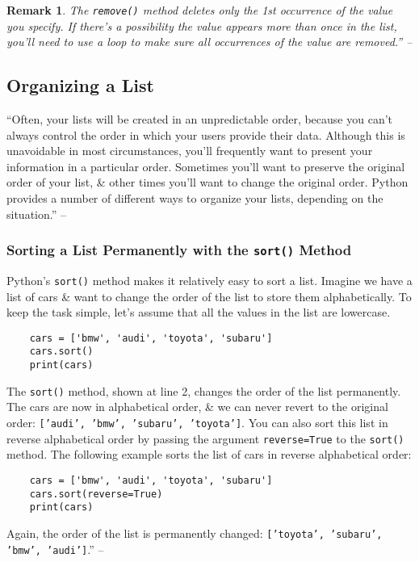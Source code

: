 \documentclass[oneside]{book}
\numberwithin{equation}{section}
\newtheorem{remark}{Remark}[chapter]
\begin{document}
\begin{remark}
	The \texttt{remove()} method deletes only the 1st occurrence of the value you specify. If there's a possibility the value appears more than once in the list, you'll need to use a loop to make sure all occurrences of the value are removed.'' -- \cite[pp. 41--42]{Matthes2019}
\end{remark}

\subsection{Organizing a List}
``Often, your lists will be created in an unpredictable order, because you can't always control the order in which your users provide their data. Although this is unavoidable in most circumstances, you'll frequently want to present your information in a particular order. Sometimes you'll want to preserve the original order of your list, \& other times you'll want to change the original order. Python provides a number of different ways to organize your lists, depending on the situation.'' -- \cite[p. 43]{Matthes2019}

\subsubsection{Sorting a List Permanently with the \texttt{sort()} Method}
Python's \texttt{sort()} method makes it relatively easy to sort a list. Imagine we have a list of cars \& want to change the order of the list to store them alphabetically. To keep the task simple, let's assume that all the values in the list are lowercase.
\begin{verbatim}
	cars = ['bmw', 'audi', 'toyota', 'subaru']
	cars.sort()
	print(cars)
\end{verbatim}
The \texttt{sort()} method, shown at line 2, changes the order of the list permanently. The cars are now in alphabetical order, \& we can never revert to the original order: \texttt{['audi', 'bmw', 'subaru', 'toyota']}. You can also sort this list in reverse alphabetical order by passing the argument \texttt{reverse=True} to the \texttt{sort()} method. The following example sorts the list of cars in reverse alphabetical order:
\begin{verbatim}
	cars = ['bmw', 'audi', 'toyota', 'subaru']
	cars.sort(reverse=True)
	print(cars)
\end{verbatim}
Again, the order of the list is permanently changed: \texttt{['toyota', 'subaru', 'bmw', 'audi']}.'' -- \cite[pp. 43--44]{Matthes2019}
\end{document}
